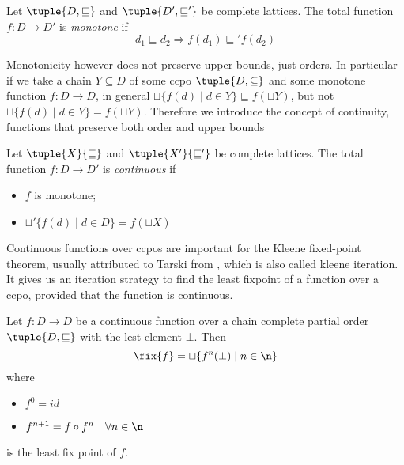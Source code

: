 \begin{definition}
  Let \(\tuple{D, \sqsubseteq}\) and \(\tuple{D', \sqsubseteq'}\) be
  complete lattices. The total function \(f : D \to D'\) is
  \emph{monotone} if
  \begin{equation*}
    d_1 \sqsubseteq d_2 \Rightarrow f(d_1) \sqsubseteq' f(d_2)
  \end{equation*}
\end{definition}


Monotonicity however does not preserve upper bounds, just orders. In
particular if we take a chain \(Y \subseteq D\) of some ccpo
\(\tuple{D, \subseteq}\) and some monotone function \(f : D \to D\),
in general \(\sqcup\{f(d) \mid d \in Y\} \sqsubseteq f(\sqcup Y)\),
but not \(\sqcup\{f(d) \mid d \in Y\} = f(\sqcup Y)\). Therefore we
introduce the concept of continuity, functions that preserve both
order and upper bounds

\begin{definition}
  Let \(\tuple{X}{\sqsubseteq}\) and \(\tuple{X'}{\sqsubseteq'}\) be
  complete lattices. The total function \(f : D \to D'\) is
  \emph{continuous} if
  \begin{itemize}
  \item \(f\) is monotone;
  \item \(\sqcup'\{f(d) \mid d \in D\} = f(\sqcup X)\)
  \end{itemize}
\end{definition}

Continuous functions over ccpos are important for the Kleene
fixed-point theorem, usually attributed to Tarski from
\cite{tarski1955lattice}, which is also called kleene iteration. It
gives us an iteration strategy to find the least fixpoint of a
function over a ccpo, provided that the function is continuous.

\begin{theorem}\label{th:fixpoint}
  Let \(f : D \to D\) be a continuous function over a chain complete
  partial order \(\tuple{D , \sqsubseteq}\) with the lest element
  \(\bot\). Then
  \begin{equation*}
    \fix{f} = \sqcup\{f^n(\bot) \mid n \in \n\}
  \end{equation*}
  where
  \begin{itemize}
  \item \(f^0 = id\)
  \item \(f^{n+1} = f \circ f^n \quad \forall n \in \n\)
  \end{itemize}
  is the least fix point of \(f\).
\end{theorem}